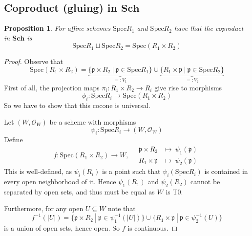 \documentclass{scrartcl}
\newcommand{\p}{\mathfrak{p}}
\newcommand{\Sch}{\mathrm{\textbf{Sch}}}
\newcommand{\Spec}{\mathrm{Spec}}
\renewcommand{\O}{\mathcal{O}}
\newtheorem{prop}{Proposition}[section]
\theoremstyle{definition}
\begin{document}
\subsection{Coproduct (gluing) in $\Sch$}

\begin{prop}
    For affine schemes $\Spec R_1$ and $\Spec R_2$ have that the coproduct in $\Sch$ is
    \begin{equation*}
        \Spec R_1 \sqcup \Spec R_2 = \Spec(R_1 \times R_2)
    \end{equation*}
\end{prop}
\begin{proof}
    Observe that
    \begin{equation*}
        \Spec(R_1 \times R_2) = \underbrace{\{ \p \times R_2 \ | \ \p \in \Spec R_1 \}}_{=: V_1} \cup \underbrace{\{ R_1 \times \p \ | \ \p \in \Spec R_2 \}}_{=: V_2}
    \end{equation*}
    First of all, the projection maps $\pi_i: R_1 \times R_2 \to R_i$ give rise to morphisms
    \begin{equation*}
        \phi_i: \Spec R_i \to \Spec(R_1 \times R_2)
    \end{equation*}
    So we have to show that this cocone is universal.

    Let $(W, \O_W)$ be a scheme with morphisms
    \begin{equation*}
        \psi_i: \Spec R_i \to (W, \O_W)
    \end{equation*}
    Define
    \begin{equation*}
        f: \Spec(R_1 \times R_2) \to W, \quad \begin{matrix*}
            \p \times R_2 &\mapsto\ \psi_1(\p) \\
            R_1 \times \p &\mapsto\ \psi_2(\p)
        \end{matrix*}
    \end{equation*}
    This is well-defined, as $\psi_i(R_i)$ is a point such that $\psi_i(\Spec R_i)$ is contained in every open neighborhood of it.
    Hence $\psi_1(R_1)$ and $\psi_2(R_2)$ cannot be separated by open sets, and thus must be equal as $W$ is T0.

    Furthermore, for any open $U \subseteq W$ note that
    \begin{equation*}
        f^{-1}(|U|) = \{ \p \times R_2 \ | \ \p \in \psi_1^{-1}(|U|) \} \cup \{ R_1 \times \p \ | \ \p \in \psi_2^{-1}(U) \}
    \end{equation*}
    is a union of open sets, hence open.
    So $f$ is continuous.


\end{proof}
\end{document}
